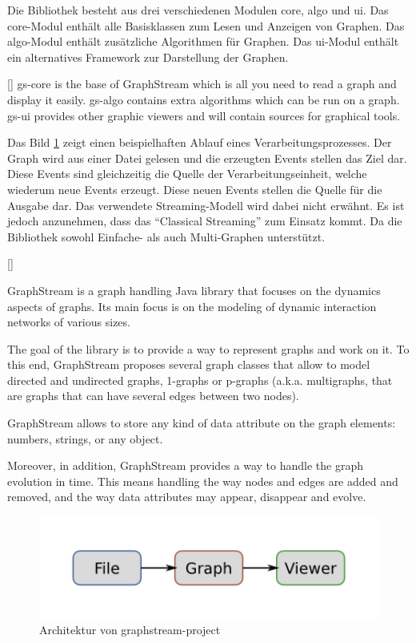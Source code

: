 Die Bibliothek besteht aus drei verschiedenen Modulen core, algo und ui. Das
core-Modul enthält alle Basisklassen zum Lesen und Anzeigen von Graphen. Das
algo-Modul enthält zusätzliche Algorithmen für Graphen. Das ui-Modul enthält ein
alternatives Framework zur Darstellung der Graphen.

[\cite{Team2018}]{
gs-core is the base of GraphStream which is all you need to read a graph and
display it easily. gs-algo contains extra algorithms which can be run on a graph.
gs-ui provides other graphic viewers and will contain sources for graphical tools.
}

Das Bild \ref{fig:graphstream-project-architecture} zeigt einen beispielhaften
Ablauf eines Verarbeitungsprozesses. Der Graph wird aus einer Datei gelesen und
die erzeugten Events stellen das Ziel dar. Diese Events sind gleichzeitig die
Quelle der Verarbeitungseinheit, welche wiederum neue Events erzeugt. Diese neuen
Events stellen die Quelle für die Ausgabe dar. Das verwendete Streaming-Modell
wird dabei nicht erwähnt. Es ist jedoch anzunehmen, dass das \enquote{Classical Streaming}
zum Einsatz kommt. Da die Bibliothek sowohl Einfache- als auch Multi-Graphen
unterstützt.

[\cite{Team2018}]{
GraphStream is a graph handling Java library that focuses on the dynamics aspects
of graphs. Its main focus is on the modeling of dynamic interaction networks of
various sizes.

The goal of the library is to provide a way to represent graphs and work on it.
To this end, GraphStream proposes several graph classes that allow to model
directed and undirected graphs, 1-graphs or p-graphs (a.k.a. multigraphs, that
are graphs that can have several edges between two nodes).

GraphStream allows to store any kind of data attribute on the graph elements:
numbers, strings, or any object.

Moreover, in addition, GraphStream provides a way to handle the graph evolution
in time. This means handling the way nodes and edges are added and removed, and
the way data attributes may appear, disappear and evolve.
}

\begin{figure}
\centering
\includegraphics[width=15cm]{../material/images/graphpipeline-graphstream.png}
\caption{Architektur von graphstream-project \parencite{Team2018}}
\label{fig:graphstream-project-architecture}
\end{figure}

